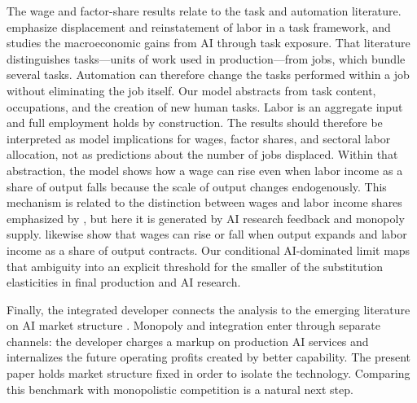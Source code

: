 The wage and factor-share results relate to the task and automation literature.
\citet{acemoglurestrepo2019} emphasize displacement and reinstatement of labor in
a task framework, and \citet{acemoglu2025} studies the macroeconomic gains from AI
through task exposure. That literature distinguishes tasks---units of work used
in production---from jobs, which bundle several tasks. Automation can therefore
change the tasks performed within a job without eliminating the job itself. Our
model abstracts from task content, occupations, and the creation of new human
tasks. Labor is an aggregate input and full employment holds by construction.
The results should therefore be interpreted as model implications for wages,
factor shares, and sectoral labor allocation, not as predictions about the number
of jobs displaced. Within that abstraction, the model shows how a wage can rise
even when labor income as a share of output falls because the scale of output
changes endogenously.
This mechanism is related to the distinction between wages and labor income shares
emphasized by \citet{autorkausik2026}, but here it is generated by AI research
feedback and monopoly supply. \citet{trammellkorinek2023} likewise show that wages
can rise or fall when output expands and labor income as a share of output contracts. Our conditional
AI-dominated limit maps that ambiguity into an explicit threshold for the
smaller of the substitution elasticities in final production and AI research.

Finally, the integrated developer connects the analysis to the emerging literature
on AI market structure \citep{korinekvipra2025,gans2024,demireretal2025}. Monopoly
and integration enter through separate channels: the developer charges a markup
on production AI services and internalizes the future operating profits created
by better capability. The present paper
holds market structure fixed in order to isolate the technology. Comparing this
benchmark with monopolistic competition is a natural next step.
